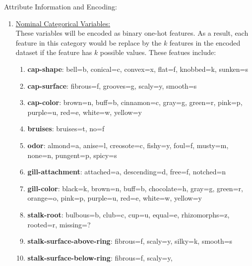 \documentclass[10pt,letterpaper]{article}
\begin{document}
Attribute Information and Encoding:
\begin{enumerate}
    \item \underline{Nominal Categorical Variables:}\\
    These variables will be encoded as binary one-hot features. As a result, each feature
    in this category would be replace by the $ k $ features in the encoded dataset if the
    feature has $ k $ possible values. These featues include:
    \begin{enumerate}[label=\roman*.]
        \item \textbf{cap-shape}:
            bell=b,
            conical=c,
            convex=x,
            flat=f,
            knobbed=k,
            sunken=s
        \item \textbf{cap-surface}:
            fibrous=f,
            grooves=g,
            scaly=y,
            smooth=s
        \item \textbf{cap-color}:
            brown=n,
            buff=b,
            cinnamon=c,
            gray=g,
            green=r,
            pink=p,
            purple=u,
            red=e,
            white=w,
            yellow=y
        \item \textbf{bruises}:
            bruises=t,
            no=f
        \item \textbf{odor}:
            almond=a,
            anise=l,
            creosote=c,
            fishy=y,
            foul=f,
            musty=m,
            none=n,
            pungent=p,
            spicy=s
        \item \textbf{gill-attachment}:
            attached=a,
            descending=d,
            free=f,
            notched=n
        \item \textbf{gill-color}:
            black=k,
            brown=n,
            buff=b,
            chocolate=h,
            gray=g,
            green=r,
            orange=o,
            pink=p,
            purple=u,
            red=e,
            white=w,
            yellow=y
        \item \textbf{stalk-root}:
            bulbous=b,
            club=c,
            cup=u,
            equal=e,
            rhizomorphs=z,
            rooted=r,
            missing=?
        \item \textbf{stalk-surface-above-ring}:
            fibrous=f,
            scaly=y,
            silky=k,
            smooth=s
        \item \textbf{stalk-surface-below-ring}:
            fibrous=f,
            scaly=y,

\end{enumerate}
\end{enumerate}
\end{document}
